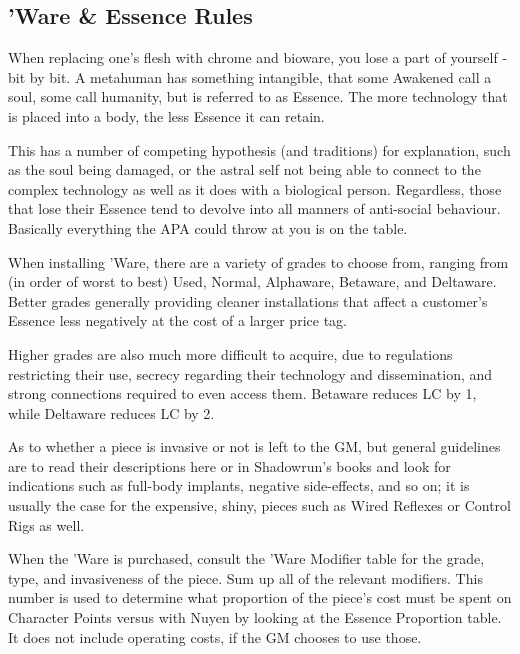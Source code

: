 
\begin{multicols*}{3}
	
	\subsection{'Ware \& Essence Rules}
	
	When replacing one's flesh with chrome and bioware, you lose a part of yourself - bit by bit. A metahuman has something intangible, that some Awakened call a soul, some call humanity, but is referred to as Essence. The more technology that is placed into a body, the less Essence it can retain. 
	
	This has a number of competing hypothesis (and traditions) for explanation, such as the soul being damaged, or the astral self not being able to connect to the complex technology as well as it does with a biological person. Regardless, those that lose their Essence tend to devolve into all manners of anti-social behaviour. Basically everything the APA could throw at you is on the table.
	
	When installing 'Ware, there are a variety of grades to choose from, ranging from (in order of worst to best) Used, Normal, Alphaware, Betaware, and Deltaware. Better grades generally providing cleaner installations that affect a customer's Essence less negatively at the cost of a larger price tag. 
	
	Higher grades are also much more difficult to acquire, due to regulations restricting their use, secrecy regarding their technology and dissemination, and strong connections required to even access them. Betaware reduces LC by 1, while Deltaware reduces LC by 2.
	
	As to whether a piece is invasive or not is left to the GM, but general guidelines are to read their descriptions here or in Shadowrun's books and look for indications such as full-body implants, negative side-effects, and so on; it is usually the case for the expensive, shiny, pieces such as Wired Reflexes or Control Rigs as well.
	
	When the 'Ware is purchased, consult the 'Ware Modifier table for the grade, type, and invasiveness of the piece. Sum up all of the relevant modifiers. This number is used to determine what proportion of the piece's cost must be spent on Character Points versus with Nuyen by looking at the Essence Proportion table. It does not include operating costs, if the GM chooses to use those.
	

\end{multicols*}
